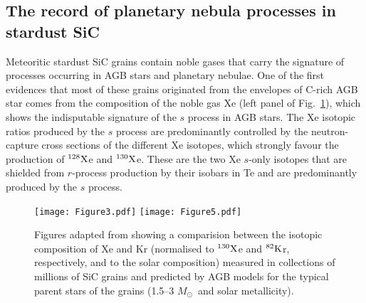 \documentclass{iau}
\newcommand{\iso}[2]{\hbox{${}^{#1}{\rm #2}$}}
\newcommand{\msun}{\ensuremath{{M}_{\odot}}}
\begin{document}
\subsection{The record of planetary nebula processes in stardust SiC}

Meteoritic stardust SiC grains contain noble gases that carry the signature of processes 
occurring in AGB stars and planetary nebulae. One of the first evidences that 
most of these grains originated from the envelopes of C-rich AGB star comes from the 
composition of the noble gas Xe (left panel of Fig.~\ref{fig3}), which shows the indisputable 
signature of the $s$ process in AGB stars. The Xe isotopic ratios produced 
by the $s$ process are predominantly controlled by the neutron-capture 
cross sections of the different Xe isotopes, which strongly favour the production
of \iso{128}Xe and \iso{130}Xe. These are the two Xe $s$-only isotopes that are 
shielded from $r$-process production by their isobars in Te and are predominantly 
produced by the $s$ process.

 \begin{figure*}
   \begin{center}
 \texttt{[image: Figure3.pdf]}
 \texttt{[image: Figure5.pdf]}\\
   \end{center}
\caption{Figures adapted from \citet{lugaro05} showing a
comparision between the isotopic composition of Xe and Kr (normalised to 
\iso{130}Xe and \iso{82}Kr, respectively, 
and to the solar composition) measured in collections of millions of 
SiC grains \citep[in {\em bulk} by][]{lewis94} and 
predicted by AGB models for the typical parent stars 
of the grains (1.5--3 \msun\ and solar metallicity).} 
\label{fig3}
\end{figure*}

\end{document}
